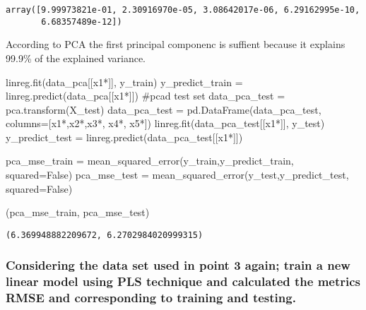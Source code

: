 \documentclass[
  letterpaper,
  DIV=11,
  numbers=noendperiod]{scrartcl}
\newenvironment{Shaded}{\begin{snugshade}}{\end{snugshade}}
\newcommand{\CommentTok}[1]{\textcolor[rgb]{0.37,0.37,0.37}{#1}}
\newcommand{\NormalTok}[1]{\textcolor[rgb]{0.00,0.23,0.31}{#1}}
\newcommand{\OperatorTok}[1]{\textcolor[rgb]{0.37,0.37,0.37}{#1}}
\newcommand{\StringTok}[1]{\textcolor[rgb]{0.13,0.47,0.30}{#1}}
\newcommand{\VariableTok}[1]{\textcolor[rgb]{0.07,0.07,0.07}{#1}}
\begin{document}
\begin{verbatim}
array([9.99973821e-01, 2.30916970e-05, 3.08642017e-06, 6.29162995e-10,
       6.68357489e-12])
\end{verbatim}

According to PCA the first principal componenc is suffient because it
explains 99.9\% of the explained variance.

\begin{Shaded}
\begin{Highlighting}[]
\NormalTok{linreg.fit(data\_pca[[}\StringTok{\textquotesingle{}x1*\textquotesingle{}}\NormalTok{]], y\_train)}
\NormalTok{y\_predict\_train }\OperatorTok{=}\NormalTok{ linreg.predict(data\_pca[[}\StringTok{\textquotesingle{}x1*\textquotesingle{}}\NormalTok{]])}
\CommentTok{\#pca\textquotesingle{}d test set}
\NormalTok{data\_pca\_test }\OperatorTok{=}\NormalTok{ pca.transform(X\_test)}
\NormalTok{data\_pca\_test }\OperatorTok{=}\NormalTok{ pd.DataFrame(data\_pca\_test, columns}\OperatorTok{=}\NormalTok{[}\StringTok{\textquotesingle{}x1*\textquotesingle{}}\NormalTok{,}\StringTok{\textquotesingle{}x2*\textquotesingle{}}\NormalTok{,}\StringTok{\textquotesingle{}x3*\textquotesingle{}}\NormalTok{, }\StringTok{\textquotesingle{}x4*\textquotesingle{}}\NormalTok{, }\StringTok{\textquotesingle{}x5*\textquotesingle{}}\NormalTok{])}
\NormalTok{linreg.fit(data\_pca\_test[[}\StringTok{\textquotesingle{}x1*\textquotesingle{}}\NormalTok{]], y\_test)}
\NormalTok{y\_predict\_test }\OperatorTok{=}\NormalTok{ linreg.predict(data\_pca\_test[[}\StringTok{\textquotesingle{}x1*\textquotesingle{}}\NormalTok{]])}

\NormalTok{pca\_mse\_train }\OperatorTok{=}\NormalTok{ mean\_squared\_error(y\_train,y\_predict\_train, squared}\OperatorTok{=}\VariableTok{False}\NormalTok{)}
\NormalTok{pca\_mse\_test }\OperatorTok{=}\NormalTok{ mean\_squared\_error(y\_test,y\_predict\_test, squared}\OperatorTok{=}\VariableTok{False}\NormalTok{)}

\NormalTok{(pca\_mse\_train, pca\_mse\_test)}
\end{Highlighting}
\end{Shaded}

\begin{verbatim}
(6.369948882209672, 6.2702984020999315)
\end{verbatim}

\hypertarget{considering-the-data-set-used-in-point-3-again-train-a-new-linear-model-using-pls-technique-and-calculated-the-metrics-rmse-and-corresponding-to-training-and-testing.}{%
\subsubsection{Considering the data set used in point 3 again; train a
new linear model using PLS technique and calculated the metrics RMSE and
corresponding to training and
testing.}\label{considering-the-data-set-used-in-point-3-again-train-a-new-linear-model-using-pls-technique-and-calculated-the-metrics-rmse-and-corresponding-to-training-and-testing.}}
\end{document}
